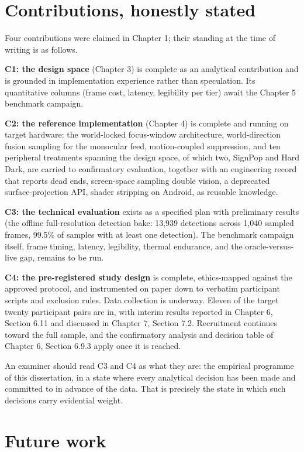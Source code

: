 \section{Contributions, honestly stated}

Four contributions were claimed in Chapter 1; their standing at the time of writing is as follows.

\textbf{C1: the design space} (Chapter 3) is complete as an analytical contribution and is grounded in
implementation experience rather than speculation. Its quantitative columns (frame cost, latency,
legibility per tier) await the Chapter 5 benchmark campaign.

\textbf{C2: the reference implementation} (Chapter 4) is complete and running on target hardware: the
world-locked focus-window architecture, world-direction fusion sampling for the monocular feed,
motion-coupled suppression, and ten peripheral treatments spanning the design space, of which two,
SignPop and Hard Dark, are carried to confirmatory evaluation, together with an engineering record
that reports dead ends, screen-space sampling double vision, a deprecated surface-projection API,
shader stripping on Android, as reusable knowledge.

\textbf{C3: the technical evaluation} exists as a specified plan with preliminary results (the offline
full-resolution detection bake: 13,939 detections across 1,040 sampled frames, 99.5\% of samples with
at least one detection). The benchmark campaign itself, frame timing, latency, legibility, thermal
endurance, and the oracle-versus-live gap, remains to be run.

\textbf{C4: the pre-registered study design} is complete, ethics-mapped against the approved protocol,
and instrumented on paper down to verbatim participant scripts and exclusion rules. Data collection is
underway. Eleven of the target twenty participant pairs are in, with interim results reported in
Chapter 6, Section 6.11 and discussed in Chapter 7, Section 7.2. Recruitment continues toward the
full sample, and the confirmatory analysis and decision table of Chapter 6, Section 6.9.3 apply once
it is reached.

An examiner should read C3 and C4 as what they are: the empirical programme of this dissertation, in
a state where every analytical decision has been made and committed to in advance of the data. That
is precisely the state in which such decisions carry evidential weight.

\section{Future work}

